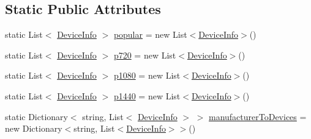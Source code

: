 \subsection*{Static Public Attributes}
\begin{DoxyCompactItemize}
\item 
static List$<$ \hyperlink{class_unity_editor_1_1_u_i_1_1_windows_1_1_plugins_1_1_device_preview_1_1_device_info}{Device\+Info} $>$ \hyperlink{class_unity_editor_1_1_u_i_1_1_windows_1_1_plugins_1_1_device_preview_1_1_parser_add31e4b893338c1ed399d8e13a6f6ea7}{popular} = new List$<$\hyperlink{class_unity_editor_1_1_u_i_1_1_windows_1_1_plugins_1_1_device_preview_1_1_device_info}{Device\+Info}$>$()
\item 
static List$<$ \hyperlink{class_unity_editor_1_1_u_i_1_1_windows_1_1_plugins_1_1_device_preview_1_1_device_info}{Device\+Info} $>$ \hyperlink{class_unity_editor_1_1_u_i_1_1_windows_1_1_plugins_1_1_device_preview_1_1_parser_ab68610960052dfb3c3be0c24f800ee32}{p720} = new List$<$\hyperlink{class_unity_editor_1_1_u_i_1_1_windows_1_1_plugins_1_1_device_preview_1_1_device_info}{Device\+Info}$>$()
\item 
static List$<$ \hyperlink{class_unity_editor_1_1_u_i_1_1_windows_1_1_plugins_1_1_device_preview_1_1_device_info}{Device\+Info} $>$ \hyperlink{class_unity_editor_1_1_u_i_1_1_windows_1_1_plugins_1_1_device_preview_1_1_parser_a4bf364272bb5ff3853cf54cb103ad3f0}{p1080} = new List$<$\hyperlink{class_unity_editor_1_1_u_i_1_1_windows_1_1_plugins_1_1_device_preview_1_1_device_info}{Device\+Info}$>$()
\item 
static List$<$ \hyperlink{class_unity_editor_1_1_u_i_1_1_windows_1_1_plugins_1_1_device_preview_1_1_device_info}{Device\+Info} $>$ \hyperlink{class_unity_editor_1_1_u_i_1_1_windows_1_1_plugins_1_1_device_preview_1_1_parser_a0a1e9e302d4a2a00f794448678f564e2}{p1440} = new List$<$\hyperlink{class_unity_editor_1_1_u_i_1_1_windows_1_1_plugins_1_1_device_preview_1_1_device_info}{Device\+Info}$>$()
\item 
static Dictionary$<$ string, List$<$ \hyperlink{class_unity_editor_1_1_u_i_1_1_windows_1_1_plugins_1_1_device_preview_1_1_device_info}{Device\+Info} $>$ $>$ \hyperlink{class_unity_editor_1_1_u_i_1_1_windows_1_1_plugins_1_1_device_preview_1_1_parser_a74705d67355ee537ac9c8c6125fe0ca0}{manufacturer\+To\+Devices} = new Dictionary$<$string, List$<$\hyperlink{class_unity_editor_1_1_u_i_1_1_windows_1_1_plugins_1_1_device_preview_1_1_device_info}{Device\+Info}$>$$>$()
\end{DoxyCompactItemize}


